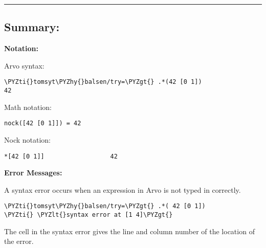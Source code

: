 \begin{center}
\rule{3in}{0.4pt}
\end{center}

\subsection{Summary:}

\textbf{Notation:}

Arvo syntax:

\begin{framed_shaded}
\begin{Verbatim}[fontsize=\relsize{-2.5},fontseries=b,commandchars=\\\{\}]
\PYZti{}tomsyt\PYZhy{}balsen/try=\PYZgt{} .*(42 [0 1]) 
42
\end{Verbatim}
\end{framed_shaded}

Math notation:

\begin{framed_shaded}
\begin{Verbatim}[fontsize=\relsize{-2.5},fontseries=b,commandchars=\\\{\}]
nock([42 [0 1]]) = 42
\end{Verbatim}
\end{framed_shaded}

Nock notation:

\begin{framed_shaded}
\begin{Verbatim}[fontsize=\relsize{-2.5},fontseries=b,commandchars=\\\{\}]
*[42 [0 1]]                  42
\end{Verbatim}
\end{framed_shaded}

\textbf{Error Messages:}

A syntax error occurs when an expression in Arvo is not typed in correctly.

\begin{framed_shaded}
\begin{Verbatim}[fontsize=\relsize{-2.5},fontseries=b,commandchars=\\\{\}]
\PYZti{}tomsyt\PYZhy{}balsen/try=\PYZgt{} .*( 42 [0 1]) 
\PYZti{} \PYZlt{}syntax error at [1 4]\PYZgt{}
\end{Verbatim}
\end{framed_shaded}

The cell in the syntax error gives the line and column number of the location of the error.

